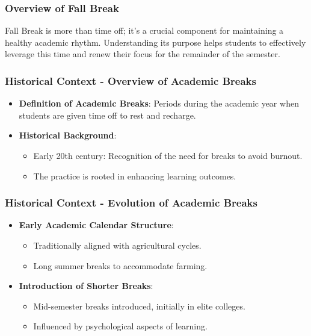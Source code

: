 \documentclass[aspectratio=169]{beamer}
\begin{document}
\begin{frame}[fragile]
    \frametitle{Overview of Fall Break}
    Fall Break is more than time off; it's a crucial component for maintaining a healthy academic rhythm. Understanding its purpose helps students to effectively leverage this time and renew their focus for the remainder of the semester.
\end{frame}

\begin{frame}[fragile]
    \frametitle{Historical Context - Overview of Academic Breaks}
    \begin{itemize}
        \item \textbf{Definition of Academic Breaks}: Periods during the academic year when students are given time off to rest and recharge.
        \item \textbf{Historical Background}: 
        \begin{itemize}
            \item Early 20th century: Recognition of the need for breaks to avoid burnout.
            \item The practice is rooted in enhancing learning outcomes.
        \end{itemize}
    \end{itemize}
\end{frame}

\begin{frame}[fragile]
    \frametitle{Historical Context - Evolution of Academic Breaks}
    \begin{itemize}
        \item \textbf{Early Academic Calendar Structure}:
        \begin{itemize}
            \item Traditionally aligned with agricultural cycles.
            \item Long summer breaks to accommodate farming.
        \end{itemize}
        \item \textbf{Introduction of Shorter Breaks}:
        \begin{itemize}
            \item Mid-semester breaks introduced, initially in elite colleges.
            \item Influenced by psychological aspects of learning.
        \end{itemize}
    \end{itemize}
\end{frame}
\end{document}
